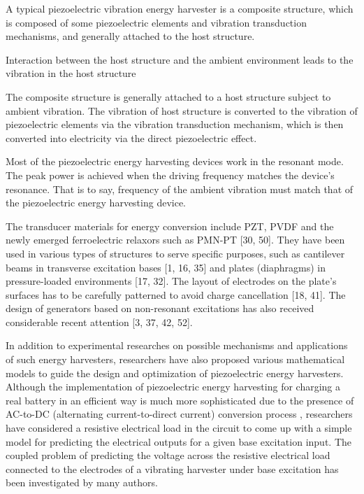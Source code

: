 \documentclass{article}
\begin{document}
A typical piezoelectric vibration energy harvester is a composite structure, which is composed of some piezoelectric elements and vibration transduction mechanisms, and generally attached to the host structure. 


Interaction between the host structure and the ambient environment leads to the vibration in the host structure 



The composite structure is generally attached to a host structure subject to ambient vibration. The vibration of host structure is converted to the vibration of piezoelectric elements via the vibration transduction mechanism, which is then converted into electricity via the direct piezoelectric effect. 


Most of the piezoelectric energy harvesting devices work in the resonant mode. The peak power is achieved when the driving frequency matches the device's resonance. \cite{roundy2003study} That is to say, frequency of the ambient vibration must match that of the piezoelectric energy harvesting device. 

The transducer materials for energy conversion include PZT, PVDF and the newly emerged ferroelectric relaxors such as PMN-PT [30, 50]. They have been used in
various types of structures to serve specific purposes, such as cantilever beams in transverse excitation bases [1, 16, 35] and plates (diaphragms) in pressure-loaded environments [17, 32]. The layout of electrodes on the plate's surfaces has to be carefully patterned to avoid charge cancellation [18, 41]. The design of generators based on non-resonant excitations has also received considerable recent attention [3, 37, 42, 52].

In addition to experimental researches on possible mechanisms and applications of such energy harvesters, researchers have also proposed various mathematical models to guide the design and optimization of piezoelectric energy harvesters. Although the implementation of piezoelectric energy harvesting for charging a real battery in an efficient way is much more sophisticated due to the presence of AC-to-DC (alternating current-to-direct current) conversion process \cite{shu2006analysis,shu2007improved,qiu2009comparison}, researchers have considered a resistive electrical load in the circuit to come up with a simple model for predicting the electrical outputs for a given base excitation input. The coupled problem of predicting the voltage across the resistive electrical load connected to the electrodes of a vibrating harvester under base excitation has been investigated by many authors. 
\end{document}
